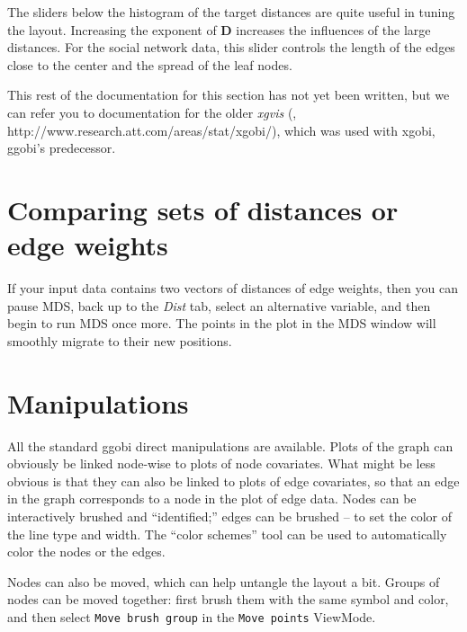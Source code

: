 \documentclass[11pt]{article}
\begin{document}
The sliders below the histogram of the target distances are quite
useful in tuning the layout.  Increasing the exponent of {\bf D}
increases the influences of the large distances.  For the social
network data, this slider controls the length of the edges close to
the center and the spread of the leaf nodes.

This rest of the documentation for this section has not yet been
written, but we can refer you to documentation for the older {\em
xgvis} (\cite{xgvis_jcgs2002},
http://www.research.att.com/areas/stat/xgobi/), which was used with
xgobi, ggobi's predecessor.

\section {Comparing sets of distances or edge weights}

If your input data contains two vectors of distances of edge weights,
then you can pause MDS, back up to the {\em Dist} tab, select an
alternative variable, and then begin to run MDS once more.  The points
in the plot in the MDS window will smoothly migrate to their new
positions.


\section{Manipulations}

All the standard ggobi direct manipulations are available.  Plots of
the graph can obviously be linked node-wise to plots of node covariates.
What might be less obvious is that they can also be linked to plots of
edge covariates, so that an edge in the graph corresponds to a node in the
plot of edge data.  Nodes can be interactively brushed and ``identified;''
edges can be brushed -- to set the color of the line type and width.
The ``color schemes'' tool can be used to automatically color the nodes
or the edges.

Nodes can also be moved, which can help untangle the layout a bit.
Groups of nodes can be moved together: first brush them with
the same symbol and color, and then select {\tt Move brush group}
in the {\tt Move points} ViewMode.

\end{document}
